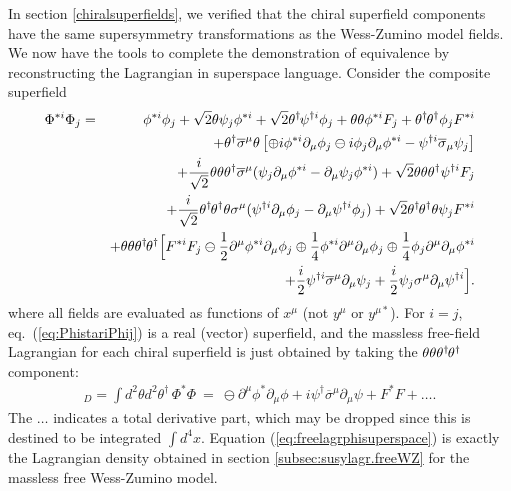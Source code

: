 \documentclass[12pt]{article}
\def\BDpos{}
\def\BDneg{-}
\def\BDplus{+}
\def\BDminus{-}
\def\thetasigmamuthetadagger{\theta\sigma^\mu\theta^\dagger}
\def\BDpos{-}
\def\BDneg{}
\def\BDplus{-}
\def\BDminus{+}
\def\thetasigmamuthetadagger{\theta^\dagger\sigmabar^\mu\theta}
\def\BDpos{\oplus}
\def\BDneg{\ominus}
\def\BDplus{\oplus}
\def\BDminus{\ominus}
\def\thetasigmamuthetadagger{\theta\sigma^\mu\theta^\dagger}
\def\BDpos{\ominus}
\def\BDneg{\oplus}
\def\BDplus{\ominus}
\def\BDminus{\oplus}
\def\thetasigmamuthetadagger{\theta^\dagger\sigmabar^\mu\theta}
\newcommand{\thdthd}{\theta^\dagger\hspace{-1pt}\theta^\dagger}
\def\beq{\begin{eqnarray}}
\def\eeq{\end{eqnarray}}
\def\sigmabar{\overline\sigma}
\begin{document}
In section \ref{chiralsuperfields}, we verified that the chiral 
superfield components have the same supersymmetry transformations as the 
Wess-Zumino model fields. We now have the tools to complete the 
demonstration of equivalence by reconstructing the Lagrangian in 
superspace language. Consider the composite superfield
\beq
\Phi^{*i} \Phi_j 
&=& 
\phi^{*i} \phi_j 
+ \sqrt{2} \theta \psi_j \phi^{*i}
+ \sqrt{2} \theta^\dagger\hspace{-1pt} \psi^{\dagger i} \phi_j
+ \theta\theta \phi^{*i} F_j
+ \thdthd \phi_j F^{*i}
\nonumber \\ &&
+ \thetasigmamuthetadagger  \left [
\BDneg i \phi^{*i} \partial_\mu \phi_j 
\BDplus i \phi_j \partial_\mu \phi^{*i}
- \psi^{\dagger i} \sigmabar_\mu \psi_j
\right ]
\nonumber \\ &&
+ \frac{i}{\sqrt{2}} \theta\theta\theta^\dagger \sigmabar^\mu (
\psi_j \partial_\mu \phi^{*i} - \partial_\mu \psi_j \phi^{*i}) 
+ \sqrt{2} \theta\theta \theta^\dagger \psi^{\dagger i} F_j
\nonumber \\ &&
+ \frac{i}{\sqrt{2}} \thdthd\theta \sigma^\mu (
\psi^{\dagger i} \partial_\mu \phi_j 
- \partial_\mu \psi^{\dagger i} \phi_j) 
+ \sqrt{2} \thdthd \theta \psi_j F^{*i}
\nonumber \\ &&
+ \theta\theta\thdthd 
\Bigl [
F^{*i} F_j 
\BDplus \frac{1}{2}\partial^\mu \phi^{*i} \partial_\mu \phi_j  
\BDminus \frac{1}{4}\phi^{*i} \partial^\mu \partial_\mu \phi_j
\BDminus \frac{1}{4}\phi_j \partial^\mu \partial_\mu \phi^{*i}
\nonumber \\ && \quad
+ \frac{i}{2} \psi^{\dagger i} \sigmabar^\mu \partial_\mu \psi_j  
+ \frac{i}{2} \psi_j \sigma^\mu \partial_\mu \psi^{\dagger i} 
\Bigr ] .
\label{eq:PhistariPhij}
\eeq
where 
all fields 
are evaluated as functions of $x^\mu$ (not $y^\mu$ or $y^{\mu *}$). 
For $i=j$, eq.~(\ref{eq:PhistariPhij}) is a real (vector) superfield, and
the massless free-field 
Lagrangian for each chiral superfield is just obtained by taking the $\theta\theta\thdthd$ component:
\beq
[\Phi^* \Phi]_D = \int d^2\theta d^2\theta^\dagger \,\Phi^* \Phi
\>=\> \BDpos \partial^\mu \phi^* \partial_\mu \phi 
+ i \psi^\dagger \sigmabar^\mu \partial_\mu \psi
+ F^* F + \ldots .
\label{eq:freelagrphisuperspace}
\eeq 
The $\ldots$ indicates a total derivative part, which may be 
dropped since this is destined to be integrated $\int d^4 x$. Equation 
(\ref{eq:freelagrphisuperspace}) is exactly the Lagrangian density 
obtained in section \ref{subsec:susylagr.freeWZ} for the massless free 
Wess-Zumino model.
\end{document}
